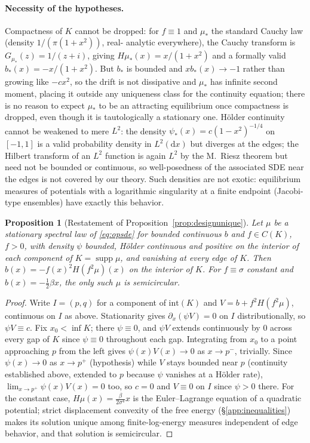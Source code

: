 \documentclass[11pt]{article}
\newcommand{\dd}{\mathrm{d}}
\DeclareMathOperator{\supp}{supp}
\theoremstyle{plain}
\newtheorem*{proposition*}{Proposition}
\theoremstyle{definition}
\theoremstyle{remark}
\begin{document}
\paragraph{Necessity of the hypotheses.} Compactness of $K$ cannot be dropped: for
$f\equiv1$ and $\mu_*$ the standard Cauchy law (density $1/(\pi(1+x^2))$, real-
analytic everywhere), the Cauchy transform is $G_{\mu_*}(z)=1/(z+i)$, giving
$H\mu_*(x)=x/(1+x^2)$ and a formally valid $b_*(x)=-x/(1+x^2)$. But $b_*$ is bounded
and $xb_*(x)\to-1$ rather than growing like $-cx^2$, so the drift is not dissipative
and $\mu_*$ has infinite second moment, placing it outside any uniqueness class for
the continuity equation; there is no reason to expect $\mu_*$ to be an attracting
equilibrium once compactness is dropped, even though it is tautologically a
stationary one. H\"older continuity cannot be weakened to mere $L^2$: the density
$\psi_*(x)=c(1-x^2)^{-1/4}$ on $[-1,1]$ is a valid probability density in $L^2(\dd x)$
but diverges at the edges; the Hilbert transform of an $L^2$ function is again $L^2$
by the M.~Riesz theorem but need not be bounded or continuous, so well-posedness of
the associated SDE near the edges is not covered by our theory. Such densities are
not exotic: equilibrium measures of potentials with a logarithmic singularity at a
finite endpoint (Jacobi-type ensembles) have exactly this behavior.

\begin{proposition*}[Restatement of Proposition~\ref{prop:designunique}]
Let $\mu$ be a stationary spectral law of \eqref{eq:opsde} for bounded continuous $b$
and $f\in C(K)$, $f>0$, with density $\psi$ bounded, H\"older continuous and positive
on the interior of each component of $K=\supp\mu$, and vanishing at every edge of $K$.
Then $b(x)=-f(x)^2H(f^2\mu)(x)$ on the interior of $K$. For $f\equiv\sigma$ constant
and $b(x)=-\tfrac12\beta x$, the only such $\mu$ is semicircular.
\end{proposition*}

\begin{proof}
Write $I=(p,q)$ for a component of $\mathrm{int}(K)$ and $V=b+f^2H(f^2\mu)$,
continuous on $I$ as above. Stationarity gives $\partial_x(\psi V)=0$ on $I$
distributionally, so $\psi V\equiv c$. Fix $x_0<\inf K$; there $\psi\equiv0$, and
$\psi V$ extends continuously by $0$ across every gap of $K$ since $\psi\equiv0$
throughout each gap. Integrating from $x_0$ to a point approaching $p$ from the left
gives $\psi(x)V(x)\to0$ as $x\to p^-$, trivially. Since $\psi(x)\to0$ as $x\to p^+$
(hypothesis) while $V$ stays bounded near $p$ (continuity established above, extended
to $p$ because $\psi$ vanishes at a H\"older rate), $\lim_{x\to p^+}\psi(x)V(x)=0$ too,
so $c=0$ and $V\equiv0$ on $I$ since $\psi>0$ there. For the constant case,
$H\mu(x)=\tfrac{\beta}{2\sigma^4}x$ is the Euler--Lagrange equation of a quadratic
potential; strict displacement convexity of the free energy (\S\ref{app:inequalities})
makes its solution unique among finite-log-energy measures independent of edge
behavior, and that solution is semicircular.
\end{proof}
\end{document}
